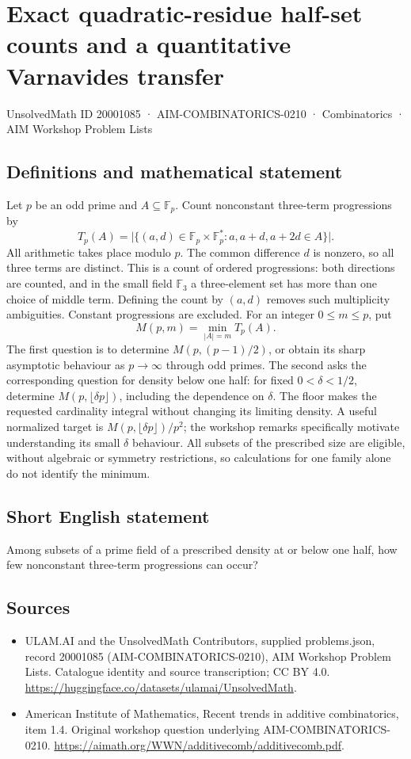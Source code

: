 \documentclass[11pt,a4paper]{article}
\begin{document}
\section*{Exact quadratic-residue half-set counts and a quantitative Varnavides transfer}\label{20001085}
{\small UnsolvedMath ID 20001085 · AIM-COMBINATORICS-0210 · Combinatorics · AIM Workshop Problem Lists}
\subsection{Definitions and mathematical statement}
Let $p$ be an odd prime and $A\subseteq\mathbb F_p$. Count nonconstant
three-term progressions by
\[
 T_p(A)=\bigl|\{(a,d)\in\mathbb F_p\times\mathbb F_p^*:
                              a,a+d,a+2d\in A\}\bigr|.
\]
All arithmetic takes place modulo $p$. The common difference $d$
is nonzero, so all three terms are distinct. This is a count of
ordered progressions: both directions are counted, and in the small
field $\mathbb F_3$ a three-element set has more than one choice of
middle term. Defining the count by $(a,d)$ removes such multiplicity
ambiguities. Constant progressions are excluded.
For an integer $0\le m\le p$, put
\[
                         M(p,m)=\min_{|A|=m}T_p(A).
\]
The first question is to determine $M(p,(p-1)/2)$, or obtain its
sharp asymptotic behaviour as $p\to\infty$ through odd primes.
The second asks the corresponding question for density below one
half: for fixed $0<\delta<1/2$, determine
$M(p,\lfloor\delta p\rfloor)$, including the dependence on $\delta$.
The floor makes the requested cardinality integral without changing
its limiting density.
A useful normalized target is $M(p,\lfloor\delta p\rfloor)/p^2$;
the workshop remarks specifically motivate understanding its small
$\delta$ behaviour. All subsets of the prescribed size are eligible,
without algebraic or symmetry restrictions, so calculations for one
family alone do not identify the minimum.
\subsection{Short English statement}
Among subsets of a prime field of a prescribed density at or below one half, how few nonconstant three-term progressions can occur?
\subsection{Sources}
\begin{itemize}
\item[S1] ULAM.AI and the UnsolvedMath Contributors, supplied problems.json, record 20001085 (AIM-COMBINATORICS-0210), AIM Workshop Problem Lists. Catalogue identity and source transcription; CC BY 4.0.
\url{https://huggingface.co/datasets/ulamai/UnsolvedMath}.
\item[S2] American Institute of Mathematics, Recent trends in additive combinatorics, item 1.4. Original workshop question underlying AIM-COMBINATORICS-0210.
\url{https://aimath.org/WWN/additivecomb/additivecomb.pdf}.
\end{itemize}
\end{document}
